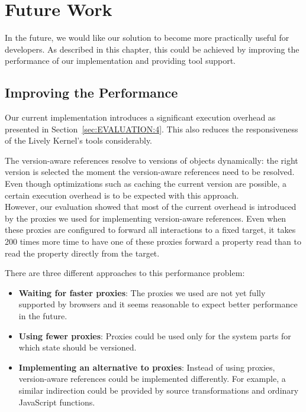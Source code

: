 \chapter{Future Work} \label{chapter:FUTURE_WORK}

In the future, we would like our solution to become more practically useful for developers.
As described in this chapter, this could be achieved by improving the performance of our implementation and providing tool support.


\section{Improving the Performance} \label{sec:FUTURE_WORK:1}

Our current implementation introduces a significant execution overhead as presented in Section~\ref{sec:EVALUATION:4}.
This also reduces the responsiveness of the Lively Kernel's tools considerably.

The version-aware references resolve to versions of objects dynamically: the right version is selected the moment the version-aware references need to be resolved.
Even though optimizations such as caching the current version are possible, a certain execution overhead is to be expected with this approach.\\
However, our evaluation showed that most of the current overhead is introduced by the proxies we used for implementing version-aware references.
Even when these proxies are configured to forward all interactions to a fixed target, it takes 200 times more time to have one of these proxies forward a property read than to read the property directly from the target.

There are three different approaches to this performance problem:

\begin{itemize}
    \item \textbf{Waiting for faster proxies}: The proxies we used are not yet fully supported by browsers and it seems reasonable to expect better performance in the future.
    \item \textbf{Using fewer proxies}: Proxies could be used only for the system parts for which state should be versioned.
    \item \textbf{Implementing an alternative to proxies}: Instead of using proxies, version-aware references could be implemented differently. For example, a similar indirection could be provided by source transformations and ordinary JavaScript functions.
\end{itemize}


